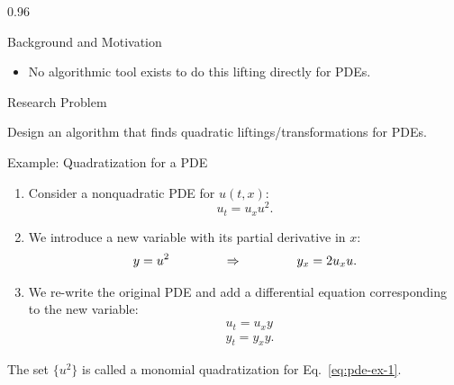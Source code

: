 \documentclass[final]{beamer}
\newlength{\colwidth}
\begin{document}
\begin{frame}[t]
\begin{columns}[t]
\begin{column}{0.96\colwidth}
\begin{block}{Background and Motivation}
\begin{itemize}
\begin{center}
          \end{center}

          \item No algorithmic tool exists to do this lifting directly for PDEs. 
        \end{itemize}
      \end{block}
      \vspace{-0.7cm}
      \begin{alertblock}{Research Problem}
        \begin{center}
        Design an algorithm that finds quadratic liftings/transformations for PDEs.
        \end{center}
      \end{alertblock}
        \vspace{-0.7cm}
      \begin{block}{Example: Quadratization for a PDE}
      \vspace{-0.2cm}

          \begin{enumerate}
              \item Consider a nonquadratic PDE for $u(t,x)$:
              \begin{equation}
              \label{eq:pde-ex-1}
                  u_t = u_xu^2.
              \end{equation}
              \item We introduce a new variable with its partial derivative in $x$:
              \begin{equation*}
                  y = u^2 \hspace{1.5cm} \Rightarrow \hspace{1.5cm} y_x = 2u_xu.
              \end{equation*}
              \item We re-write the original PDE and add a differential equation corresponding to the new variable:
              \begin{align*}
                  & u_t = u_xy \\
                  & y_t = y_xy.
              \end{align*}
          \end{enumerate}
          The set $\{u^2\}$ is called a monomial quadratization for Eq.~\eqref{eq:pde-ex-1}.
        

\end{block}
\end{column}
\end{columns}
\end{frame}
\end{document}
